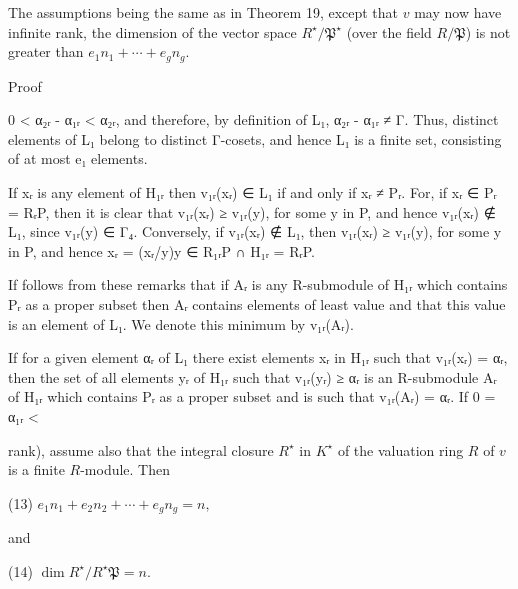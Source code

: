 The assumptions being the same as in Theorem 19, except that $v$ may now have infinite rank, the dimension of the vector space $R^\star/\mathfrak{P}^\star$ (over the field $R/\mathfrak{P}$) is not greater than $e_1n_1 + \cdots + e_gn_g$.

Proof

0 < α₂ᵣ - α₁ᵣ < α₂ᵣ, and therefore, by definition of L₁, α₂ᵣ - α₁ᵣ ≠ Γ. Thus, distinct elements of L₁ belong to distinct Γ-cosets, and hence L₁ is a finite set, consisting of at most e₁ elements.

If xᵣ is any element of H₁ᵣ then v₁ᵣ(xᵣ) ∈ L₁ if and only if xᵣ ≠ Pᵣ. For, if xᵣ ∈ Pᵣ = RᵣP, then it is clear that v₁ᵣ(xᵣ) ≥ v₁ᵣ(y), for some y in P, and hence v₁ᵣ(xᵣ) ∉ L₁, since v₁ᵣ(y) ∈ Γ₄. Conversely, if v₁ᵣ(xᵣ) ∉ L₁, then v₁ᵣ(xᵣ) ≥ v₁ᵣ(y), for some y in P, and hence xᵣ = (xᵣ/y)y ∈ R₁ᵣP ∩ H₁ᵣ = RᵣP.

If follows from these remarks that if Aᵣ is any R-submodule of H₁ᵣ which contains Pᵣ as a proper subset then Aᵣ contains elements of least value and that this value is an element of L₁. We denote this minimum by v₁ᵣ(Aᵣ).

If for a given element αᵣ of L₁ there exist elements xᵣ in H₁ᵣ such that v₁ᵣ(xᵣ) = αᵣ, then the set of all elements yᵣ of H₁ᵣ such that v₁ᵣ(yᵣ) ≥ αᵣ is an R-submodule Aᵣ of H₁ᵣ which contains Pᵣ as a proper subset and is such that v₁ᵣ(Aᵣ) = αᵣ. If 0 = α₁ᵣ <

rank), assume also that the integral closure $R^\star$ in $K^\star$ of the valuation ring $R$ of $v$ is a finite $R$-module. Then

(13) $e_1n_1 + e_2n_2 + \cdots + e_gn_g = n,$

and

(14) $\dim R^\star/R^\star\mathfrak{P} = n.$